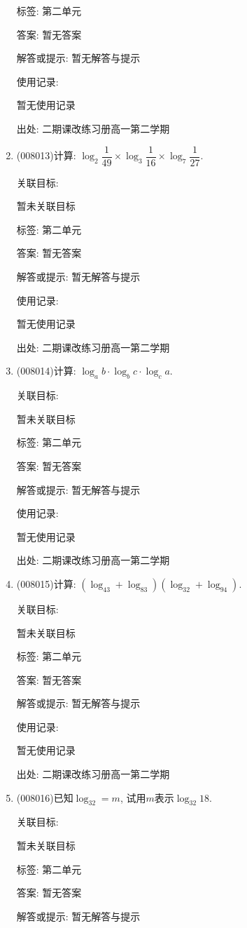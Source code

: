 \documentclass[10pt,a4paper]{article}
\begin{document}
\begin{enumerate}[1.]
标签: 第二单元

答案: 暂无答案

解答或提示: 暂无解答与提示

使用记录:

暂无使用记录


出处: 二期课改练习册高一第二学期
\item { (008013)}计算: $\log _2\dfrac 1{49}\times \log _3\dfrac 1{16}\times \log _7\dfrac 1{27}$.


关联目标:

暂未关联目标



标签: 第二单元

答案: 暂无答案

解答或提示: 暂无解答与提示

使用记录:

暂无使用记录


出处: 二期课改练习册高一第二学期
\item { (008014)}计算: $\log _ab\cdot \log _bc\cdot \log _ca$.


关联目标:

暂未关联目标



标签: 第二单元

答案: 暂无答案

解答或提示: 暂无解答与提示

使用记录:

暂无使用记录


出处: 二期课改练习册高一第二学期
\item { (008015)}计算: $(\log _43+\log _83)(\log _32+\log _94)$.


关联目标:

暂未关联目标



标签: 第二单元

答案: 暂无答案

解答或提示: 暂无解答与提示

使用记录:

暂无使用记录


出处: 二期课改练习册高一第二学期
\item { (008016)}已知$\log _32=m$, 试用$m$表示$\log _{32}18$.


关联目标:

暂未关联目标



标签: 第二单元

答案: 暂无答案

解答或提示: 暂无解答与提示


\end{enumerate}
\end{document}
